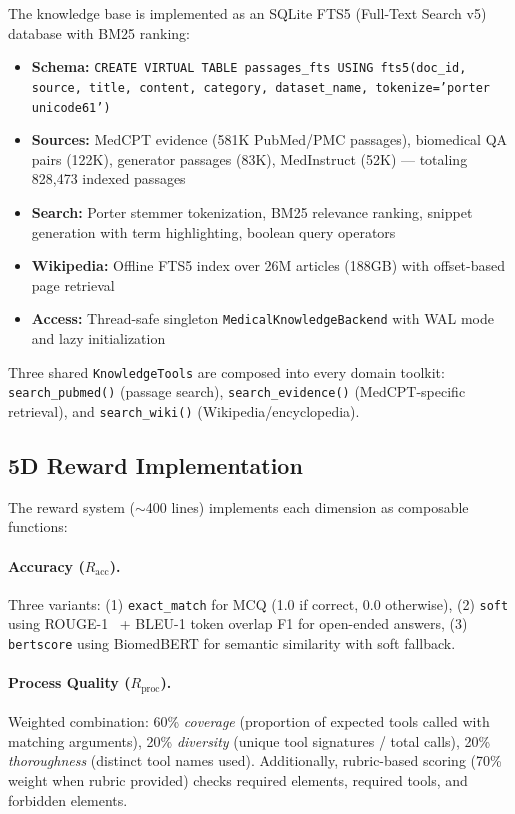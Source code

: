\documentclass{article}
\begin{document}
The knowledge base is implemented as an SQLite FTS5 (Full-Text Search v5) database with BM25 ranking:

\begin{itemize}[leftmargin=*,itemsep=1pt]
    \item \textbf{Schema:} \texttt{CREATE VIRTUAL TABLE passages\_fts USING fts5(doc\_id, source, title, content, category, dataset\_name, tokenize='porter unicode61')}
    \item \textbf{Sources:} MedCPT evidence (581K PubMed/PMC passages), biomedical QA pairs (122K), generator passages (83K), MedInstruct (52K) --- totaling 828,473 indexed passages
    \item \textbf{Search:} Porter stemmer tokenization, BM25 relevance ranking, snippet generation with term highlighting, boolean query operators
    \item \textbf{Wikipedia:} Offline FTS5 index over 26M articles (188GB) with offset-based page retrieval
    \item \textbf{Access:} Thread-safe singleton \texttt{MedicalKnowledgeBackend} with WAL mode and lazy initialization
\end{itemize}

Three shared \texttt{KnowledgeTools} are composed into every domain toolkit: \texttt{search\_pubmed()} (passage search), \texttt{search\_evidence()} (MedCPT-specific retrieval), and \texttt{search\_wiki()} (Wikipedia/encyclopedia).

\subsection{5D Reward Implementation}

The reward system ($\sim$400 lines) implements each dimension as composable functions:

\paragraph{Accuracy ($R_{\text{acc}}$).} Three variants: (1) \texttt{exact\_match} for MCQ (1.0 if correct, 0.0 otherwise), (2) \texttt{soft} using ROUGE-1~\citep{lin2004rouge} + BLEU-1 token overlap F1 for open-ended answers, (3) \texttt{bertscore} using BiomedBERT for semantic similarity with soft fallback.

\paragraph{Process Quality ($R_{\text{proc}}$).} Weighted combination: 60\% \emph{coverage} (proportion of expected tools called with matching arguments), 20\% \emph{diversity} (unique tool signatures / total calls), 20\% \emph{thoroughness} (distinct tool names used). Additionally, rubric-based scoring (70\% weight when rubric provided) checks required elements, required tools, and forbidden elements.
\end{document}
